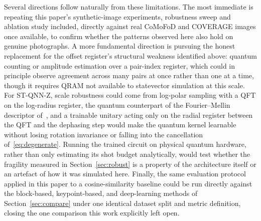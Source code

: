 \documentclass[conference]{IEEEtran}
\begin{document}
Several directions follow naturally from these limitations. The most immediate is repeating this paper's synthetic-image experiments, robustness sweep and ablation study included, directly against real CoMoFoD and COVERAGE images once available, to confirm whether the patterns observed here also hold on genuine photographs. A more fundamental direction is pursuing the honest replacement for the offset register's structural weakness identified above: quantum counting or amplitude estimation over a pair-index register, which could in principle observe agreement across many pairs at once rather than one at a time, though it requires QRAM not available to statevector simulation at this scale. For ST-QNN-Z, scale robustness could come from log-polar sampling with a QFT on the log-radius register, the quantum counterpart of the Fourier--Mellin descriptor of~\cite{cozzolino2015}, and a trainable unitary acting only on the radial register between the QFT and the dephasing step would make the quantum kernel learnable without losing rotation invariance or falling into the cancellation of~\eqref{eq:degenerate}. Running the trained circuit on physical quantum hardware, rather than only estimating its shot budget analytically, would test whether the fragility measured in Section~\ref{sec:robust} is a property of the architecture itself or an artefact of how it was simulated here. Finally, the same evaluation protocol applied in this paper to a cosine-similarity baseline could be run directly against the block-based, keypoint-based, and deep-learning methods of Section~\ref{sec:compare} under one identical dataset split and metric definition, closing the one comparison this work explicitly left open.
\end{document}
